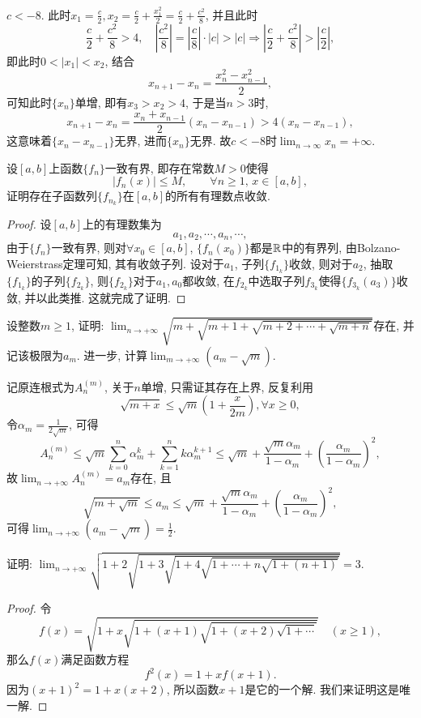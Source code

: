 \begin{quizb}
\begin{solution}
\begin{asparaenum}[\bfseries (i)]
\item \(c<-8\). 此时\(x_1=\frac{c}{2},x_2=\frac{c}{2}+\frac{x_1^2}{2}=\frac{c}{2}+\frac{c^2}{8}\), 并且此时\[\frac{c}{2}+\frac{c^2}{8}>4,\quad \left|\frac{c^2}{8}\right|=\left|\frac{c}{8}\right|\cdot|c|>|c|\Rightarrow\left|\frac{c}{2}+\frac{c^2}{8}\right|>\left|\frac{c}{2}\right|,\]即此时\(0<|x_1|<x_2\), 结合\[x_{n+1}-x_n=\frac{x_n^2-x_{n-1}^2}{2},\]可知此时\(\{x_n\}\)单增, 即有\(x_3>x_2>4\), 于是当\(n>3\)时, \[x_{n+1}-x_n=\frac{x_n+x_{n-1}}{2}\left(x_n-x_{n-1}\right)>4\left(x_n-x_{n-1}\right),\]这意味着\(\{x_n-x_{n-1}\}\)无界, 进而\(\{x_n\}\)无界. 故\(c<-8\)时\(\lim_{n\rightarrow\infty}x_n=+\infty.\)\qedhere
\end{asparaenum}
\end{solution}
\woe 设\([a,b]\)上函数\(\{f_n\}\)一致有界, 即存在常数\(M>0\)使得\[\left|f_n(x)\right|\leqslant M,\qquad\forall n\geqslant 1,\,x\in [a,b],\]证明存在子函数列\(\{f_{n_k}\}\)在\([a,b]\)的所有有理数点收敛.
\begin{proof}
设\([a,b]\)上的有理数集为\[a_1,a_2,\cdots,a_n,\cdots,\]由于\(\{f_n\}\)一致有界, 则对\(\forall x_0\in [a,b]\), \(\{f_n(x_0)\}\)都是\(\mathbb{R}\)中的有界列, 由Bolzano-Weierstrass定理可知, 其有收敛子列. 设对于\(a_1\), 子列\(\{f_{1_k}\}\)收敛, 则对于\(a_2\), 抽取\(\{f_{1_k}\}\)的子列\(\{f_{2_k}\}\), 则\(\{f_{2_k}\}\)对于\(a_1,a_0\)都收敛, 在\(f_{2_k}\)中选取子列\(f_{3_k}\)使得\(\{f_{3_k}(a_3)\}\)收敛, 并以此类推. 这就完成了证明.
\end{proof}
\woe 设整数\(m\geqslant 1\), 证明: \(\lim_{n\rightarrow+\infty}\sqrt{m+\sqrt{m+1+\sqrt{m+2+\cdots+\sqrt{m+n}}}}\)存在, 并记该极限为\(a_m\). 进一步, 计算\(\lim_{m\rightarrow+\infty}\left(a_m-\sqrt{m}\right)\).
\begin{solution}
记原连根式为\(A_n^{(m)}\), 关于\(n\)单增, 只需证其存在上界, 反复利用\[\sqrt{m+x}\leqslant\sqrt{m}\left(1+\frac{x}{2m}\right),\forall x\geqslant 0,\]令\(\alpha_m=\frac{1}{2\sqrt{m}}\), 可得\[A_n^{(m)}\leqslant\sqrt{m}\sum_{k=0}^{n}\alpha_m^k+\sum_{k=1}^{n}k\alpha_m^{k+1}\leqslant\sqrt{m}+\frac{\sqrt{m}\alpha_m}{1-\alpha_m}+\left(\frac{\alpha_m}{1-\alpha_m}\right)^2,\]故\(\lim_{n\rightarrow+\infty}A_n^{(m)}=a_m\)存在, 且\[\sqrt{m+\sqrt{m}}\leqslant a_m\leqslant\sqrt{m}+\frac{\sqrt{m}\alpha_m}{1-\alpha_m}+\left(\frac{\alpha_m}{1-\alpha_m}\right)^2,\]可得\(\lim_{n\rightarrow+\infty}\left(a_m-\sqrt{m}\right)=\frac{1}{2}\).
\end{solution}
\woe 证明: \(\lim_{n\rightarrow+\infty}\sqrt{1+2\sqrt{1+3\sqrt{1+4\sqrt{1+\cdots+n\sqrt{1+(n+1)}}}}}=3.\)
\begin{proof}
令\[f(x)=\sqrt{1+x\sqrt{1+(x+1)\sqrt{1+(x+2)\sqrt{1+\cdots}}}}\quad (x\geqslant 1),\]那么\(f(x)\)满足函数方程\[f^2(x)=1+xf(x+1).\]因为\((x+1)^2=1+x(x+2)\), 所以函数\(x+1\)是它的一个解. 我们来证明这是唯一解.


\end{proof}
\end{quizb}
